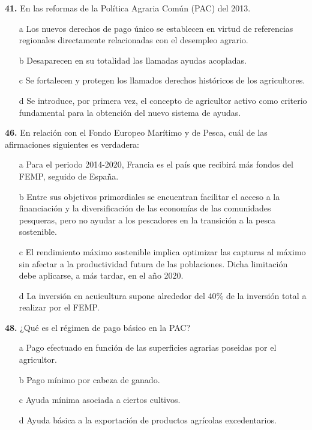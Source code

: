 \documentclass{nuevotema}
\begin{document}
\textbf{41.} En las reformas de la Política Agraria Común (PAC) del 2013.

\begin{itemize}
	\item[a] Los nuevos derechos de pago único se establecen en virtud de referencias regionales directamente relacionadas con el desempleo agrario.
	\item[b] Desaparecen en su totalidad las llamadas ayudas acopladas.
	\item[c] Se fortalecen y protegen los llamados derechos históricos de los agricultores.
	\item[d] Se introduce, por primera vez, el concepto de agricultor activo como criterio fundamental para la obtención del nuevo sistema de ayudas.
\end{itemize}


\textbf{46.} En relación con el Fondo Europeo Marítimo y de Pesca, cuál de las afirmaciones siguientes es verdadera:

\begin{enumerate}
    \item[a] Para el periodo 2014-2020, Francia es el país que recibirá más fondos del FEMP, seguido de España.
    \item[b] Entre sus objetivos primordiales se encuentran facilitar el acceso a la financiación y la diversificación de las economías de las comunidades pesqueras, pero no ayudar a los pescadores en la transición a la pesca sostenible.
    \item[c] El rendimiento máximo sostenible implica optimizar las capturas al máximo sin afectar a la productividad futura de las poblaciones. Dicha limitación debe aplicarse, a más tardar, en el año 2020.
    \item[d] La inversión en acuicultura supone alrededor del 40\% de la inversión total a realizar por el FEMP.
\end{enumerate}

\textbf{48.} ¿Qué es el régimen de pago básico en la PAC?
\begin{enumerate}
    \item[a] Pago efectuado en función de las superficies agrarias poseidas por el agricultor.
    \item[b] Pago mínimo por cabeza de ganado.
    \item[c] Ayuda mínima asociada a ciertos cultivos.
    \item[d] Ayuda básica a la exportación de productos agrícolas excedentarios.
\end{enumerate}
\end{document}
